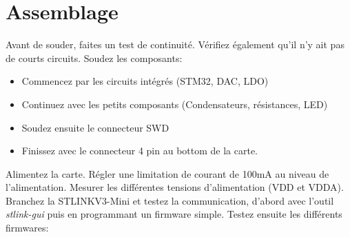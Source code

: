\documentclass[12pt,%
addpoints,%
]{exam}
\begin{document}
\section{Assemblage}
\begin{questions}
	\question Avant de souder, faites un test de continuité. Vérifiez également qu'il n'y ait pas de courts circuits.
	\question Soudez les composants:
	\begin{itemize}
		\item Commencez par les circuits intégrés (STM32, DAC, LDO)
		\item Continuez avec les petits composants (Condensateurs, résistances, LED)
		\item Soudez ensuite le connecteur SWD
		\item Finissez avec le connecteur 4 pin au bottom de la carte.
	\end{itemize}
	\question Alimentez la carte. Régler une limitation de courant de 100mA au niveau de l'alimentation.
	\question Mesurer les différentes tensions d'alimentation (VDD et VDDA).
	\question Branchez la STLINKV3-Mini et testez la communication, d'abord avec l'outil \emph{stlink-gui} puis en programmant un firmware simple.
	\question Testez ensuite les différents firmwares:
\end{questions}
\end{document}
